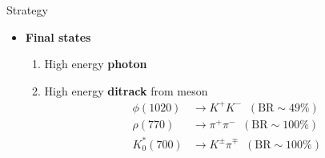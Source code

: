 \documentclass[9pt,aspectratio=1610]{beamer}
\newcommand{\hl}[1]{\textbf{\color{structure}#1}}
\begin{document}
\begin{frame}{Strategy}
	\begin{itemize}
		\item \hl{Final states}
		\begin{enumerate}
			\item High energy \textbf{photon}
			\item High energy \textbf{ditrack} from meson
			\begin{align*}
				\phi(1020)&\rightarrow K^+K^-\;\;(\mathrm{BR} \sim 49\%)\\
				\rho(770)&\rightarrow \pi^+\pi^-\;\;(\mathrm{BR} \sim 100\%)\\
				K^*_0(700)&\rightarrow K^\pm\pi^\mp\;\;(\mathrm{BR} \sim 100\%)
			\end{align*}
		\end{enumerate}
	\end{itemize}
\end{frame}
\end{document}
